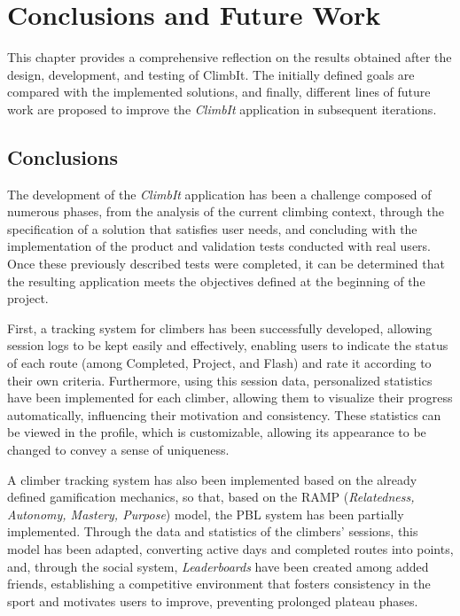 \chapter{Conclusions and Future Work} 
\label{cap:conclusions}

This chapter provides a comprehensive reflection on the results obtained after the design, development, and testing of ClimbIt. The initially defined goals are compared with the implemented solutions, and finally, different lines of future work are proposed to improve the \textit{ClimbIt} application in subsequent iterations. 

\section{Conclusions} 

The development of the \textit{ClimbIt} application has been a challenge composed of numerous phases, from the analysis of the current climbing context, through the specification of a solution that satisfies user needs, and concluding with the implementation of the product and validation tests conducted with real users. Once these previously described tests were completed, it can be determined that the resulting application meets the objectives defined at the beginning of the project. 

First, a tracking system for climbers has been successfully developed, allowing session logs to be kept easily and effectively, enabling users to indicate the status of each route (among Completed, Project, and Flash) and rate it according to their own criteria. Furthermore, using this session data, personalized statistics have been implemented for each climber, allowing them to visualize their progress automatically, influencing their motivation and consistency. These statistics can be viewed in the profile, which is customizable, allowing its appearance to be changed to convey a sense of uniqueness. 

A climber tracking system has also been implemented based on the already defined gamification mechanics, so that, based on the RAMP (\textit{Relatedness, Autonomy, Mastery, Purpose}) model, the PBL system has been partially implemented. Through the data and statistics of the climbers' sessions, this model has been adapted, converting active days and completed routes into points, and, through the social system, \textit{Leaderboards} have been created among added friends, establishing a competitive environment that fosters consistency in the sport and motivates users to improve, preventing prolonged plateau phases. 

